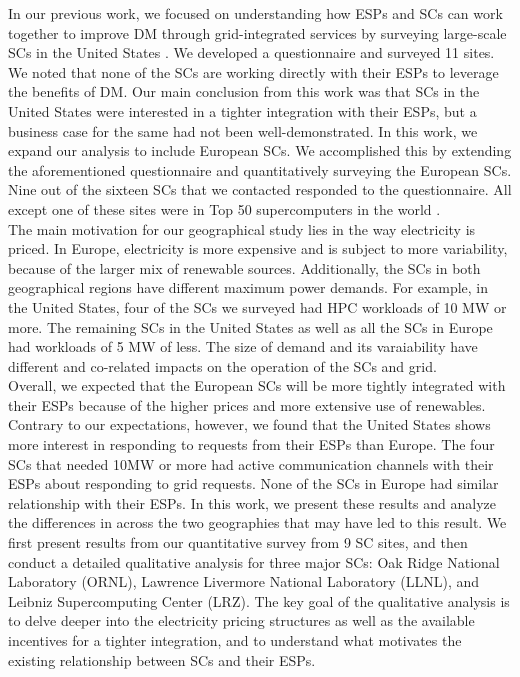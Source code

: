 In our previous work, we focused on understanding how ESPs and SCs can work together to improve DM through grid-integrated services by surveying large-scale SCs in the United States \cite{BatesESP}. We developed a questionnaire and surveyed 11 sites. We noted that none of the SCs are working directly with their ESPs to leverage the benefits of DM. Our main conclusion from this work was that SCs in the United States were interested in a tighter integration with their ESPs, but a business case for the same had not been well-demonstrated. In this work, we expand our analysis to include European SCs. We accomplished this by extending the aforementioned questionnaire and quantitatively surveying the European SCs. Nine out of the sixteen SCs that we contacted responded to the questionnaire. All except one of these sites were in Top 50 supercomputers in the world \cite{Top500}. \\

The main motivation for our geographical study lies in the way electricity is priced. In Europe, electricity is more expensive and is subject to more variability, because of the larger mix of renewable sources. Additionally, the SCs in both geographical regions have different maximum power demands. For example, in the United States, four of the SCs we surveyed had HPC workloads of 10 MW or more. The remaining SCs  in the United States as well as all the SCs in Europe had workloads of 5 MW of less. The size of demand and its varaiability have different and co-related impacts on the operation of the SCs and grid. \\

Overall, we expected that the European SCs will be more tightly integrated with their ESPs because of the higher prices and more extensive use of renewables.  Contrary to our expectations, however, we found that the United States shows more interest in responding to requests from their ESPs than Europe. The four SCs that needed 10MW or more had active communication channels with their ESPs about responding to grid requests.  None of the SCs in Europe had similar relationship with their ESPs. In this work, we present these results and analyze the differences in across the two geographies that may have led to this result. We first present results from our quantitative survey from 9 SC sites, and then conduct a detailed qualitative analysis for three major SCs: Oak Ridge National Laboratory (ORNL), Lawrence Livermore National Laboratory (LLNL), and Leibniz Supercomputing Center (LRZ). The key goal of the qualitative analysis is to delve deeper into the electricity pricing structures as well as the available incentives for a tighter integration, and to understand what motivates the existing relationship between SCs and their ESPs. \\


